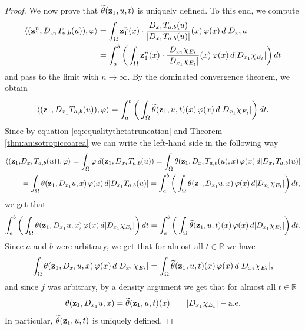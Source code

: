 \documentclass[reqno,12pt]{amsart}
\def\z{{\bf z}}
\def\R{\mathbb R}
\numberwithin{equation}{section}
\begin{document}
\begin{proof}
We now prove that $\widetilde{\theta}(\z_1,u,t)$ is uniquely defined. To this end, we compute
\begin{align}
\langle (\z^n_1, D_{x_1} T_{a,b} (u)), \varphi \rangle &= \int_\Omega \z_1^n(x) \cdot \frac{D_{x_1} T_{a,b}(u)}{|D_{x_1} T_{a,b}(u)|}(x) \, \varphi(x) \, d|D_{x_1} u| \\
&= \int_{a}^{b} \bigg( \int_\Omega \z_1^n(x) \cdot \frac{D_{x_1} \chi_{E_t}}{|D_{x_1} \chi_{E_t}|}(x) \, \varphi(x) \, d|D_{x_1} \chi_{E_t}| \bigg) \, dt
\end{align}
and pass to the limit with $n \rightarrow \infty$. By the dominated convergence theorem, we obtain
\begin{align}
\langle (\z_1, D_{x_1} T_{a,b} (u)), \varphi \rangle = \int_{a}^{b} \bigg( \int_\Omega \widetilde{\theta}(\z_1,u,t)(x) \, \varphi(x) \, d|D_{x_1} \chi_{E_t}| \bigg) \, dt.
\end{align}
Since by equation \eqref{eq:equalitythetatruncation} and Theorem \ref{thm:anisotropiccoarea} we can write the left-hand side in the following way
\begin{align}
\langle (\z_1, &D_{x_1} T_{a,b} (u)), \varphi \rangle = \int_\Omega \varphi \, d(\z_1,D_{x_1} T_{a,b}(u)) = \int_\Omega \theta(\z_1, D_{x_1} T_{a,b}(u),x) \, \varphi(x) \, d|D_{x_1} T_{a,b}(u)| \\
&= \int_\Omega \theta(\z_1, D_{x_1} u,x) \, \varphi(x) \, d|D_{x_1} T_{a,b}(u)| = \int_a^b \bigg( \int_\Omega \theta(\z_1, D_{x_1} u,x) \, \varphi(x) \, d|D_{x_1} \chi_{E_t}| \bigg) \, dt,
\end{align}
we get that
\begin{equation}
\int_a^b \bigg( \int_\Omega \theta(\z_1, D_{x_1} u,x) \, \varphi(x) \, d|D_{x_1} \chi_{E_t}| \bigg) \, dt = \int_{a}^{b} \bigg( \int_\Omega \widetilde{\theta}(\z_1,u,t)(x) \, \varphi(x) \, d|D_{x_1} \chi_{E_t}| \bigg) \, dt.
\end{equation}
Since $a$ and $b$ were arbitrary, we get that for almost all $t \in \mathbb{R}$ we have
\begin{equation}
\int_\Omega \theta(\z_1, D_{x_1} u,x) \, \varphi(x) \, d|D_{x_1} \chi_{E_t}| = \int_\Omega \widetilde{\theta}(\z_1,u,t)(x) \, \varphi(x) \, d|D_{x_1} \chi_{E_t}|,
\end{equation}
and since $f$ was arbitrary, by a density argument we get that for almost all $t \in \R$
\begin{equation}\label{eq:equalityofthetasforalmostallt}
\theta(\z_1, D_{x_1} u,x) = \widetilde{\theta}(\z_1,u,t)(x) \qquad |D_{x_1} \chi_{E_t}|-\mbox{a.e.}
\end{equation}
In particular, $\widetilde{\theta}(\z_1,u,t)$ is uniquely defined. 


\end{proof}
\end{document}

